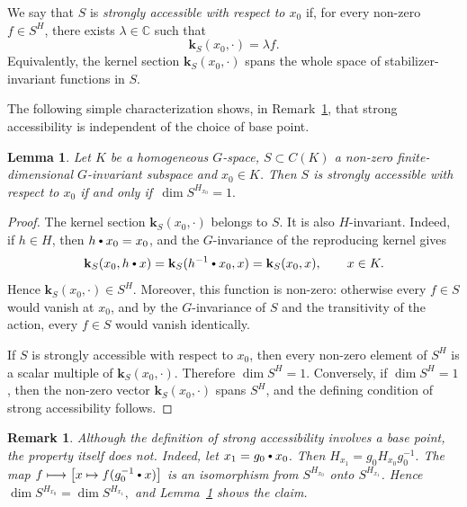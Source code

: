 \documentclass[11pt,showkeys]{amsart}
\newtheorem{lemma}[theorem]{Lemma}
\newtheorem{remark}[theorem]{Remark}
\newcommand{\hbullet}{\mathbin{\vcenter{\hbox{\scalebox{0.7}{$\bullet$}}}}}
\begin{document}
We say that  \(S\) is \emph{strongly accessible with respect to \(x_0\)}
if, for every non-zero \(f\in S^H\), there exists
\(\lambda\in\mathbb C\) such that
\[
          \mathbf k_S(x_0,\cdot)=\lambda f .
\]
Equivalently, the kernel section \( \mathbf k_S(x_0,\cdot)\) spans the whole
space of stabilizer-invariant functions in \(S\).


The following simple characterization shows, in
Remark~\ref{nox0}, that strong accessibility is independent of the
choice of base point.



\begin{lemma}
\label{lem:strong-accessibility-stabilizer}
Let \(K\) be a homogeneous \(G\)-space,
 \(S\subset C(K)\) a non-zero finite-dimensional \(G\)-invariant
subspace and $x_0 \in K$. Then \(S\) is strongly accessible with respect to \(x_0\) if
and only if
\(
       \, \dim S^{H_{x_0}}=1 .
\)
\end{lemma}

\begin{proof}
The kernel section \(\mathbf k_S(x_0,\cdot)\) belongs to \(S\). It is also
\(H\)-invariant. Indeed, if \(h\in H\), then \(h\hbullet x_0=x_0\), and
the \(G\)-invariance of the reproducing kernel gives
\[
        \mathbf k_S(x_0,h\hbullet x)
        =
        \mathbf k_S(h^{-1}\hbullet x_0,x)
        =
        \mathbf k_S(x_0,x),
        \qquad x\in K .
\]
Hence \(\mathbf k_S(x_0,\cdot)\in S^H\). Moreover, this function is non-zero:
otherwise every \(f\in S\) would vanish at \(x_0\), and by the
\(G\)-invariance of \(S\) and the transitivity of the action, every
\(f\in S\) would vanish identically.

If \(S\) is strongly accessible with respect to \(x_0\), then every
non-zero element of \(S^H\) is a scalar multiple of
\(\mathbf k_S(x_0,\cdot)\). Therefore \(\dim S^H=1\). Conversely, if
\(\dim S^H=1\), then the non-zero vector \(\mathbf k_S(x_0,\cdot)\) spans
\(S^H\), and the defining condition of strong accessibility follows.
\end{proof}


\begin{remark}
\label{nox0}
   Although the definition of strong accessibility involves a base point, the property itself does
not. Indeed, let \(x_1=g_0\hbullet x_0\). Then
\(
        H_{x_1}=g_0H_{x_0}g_0^{-1}.
\)
The map
\(
        f\longmapsto \bigl[x\mapsto f(g_0^{-1}\hbullet x)\bigr]
\)
is an isomorphism from \(S^{H_{x_0}}\) onto \(S^{H_{x_1}}\). Hence
\(
        \dim S^{H_{x_0}}=\dim S^{H_{x_1}},
\)
and Lemma~\ref{lem:strong-accessibility-stabilizer} shows the claim.
\end{remark}
\end{document}
